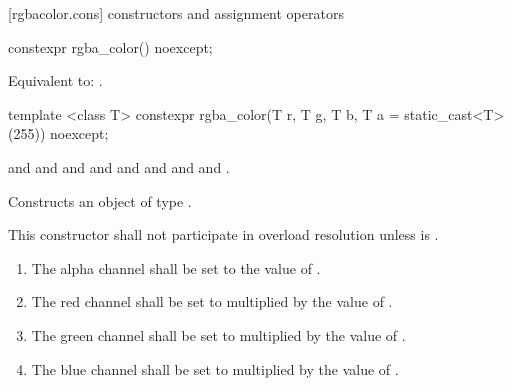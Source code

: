  [rgbacolor.cons] { constructors and assignment operators}

\begin{itemdecl}
constexpr rgba_color() noexcept;
\end{itemdecl}
\begin{itemdescr}
\pnum
\effects
Equivalent to: .
\end{itemdescr}

\begin{itemdecl}
template <class T>
constexpr rgba_color(T r, T g, T b, T a = static_cast<T>(255)) noexcept;
\end{itemdecl}
\begin{itemdescr}
\pnum
\requires
{} and  and  and  and  and  and  and  and .

\pnum
\effects
Constructs an object of type .

\pnum
\remarks
This constructor shall not participate in overload resolution unless  is .
\begin{enumerate}
\item The alpha channel shall be set to the value of .
\item The red channel shall be set to  multiplied by the value of  .
\item The green channel shall be set to  multiplied by the value of .
\item The blue channel shall be set to  multiplied by the value of .
\end{enumerate}
\end{itemdescr}

